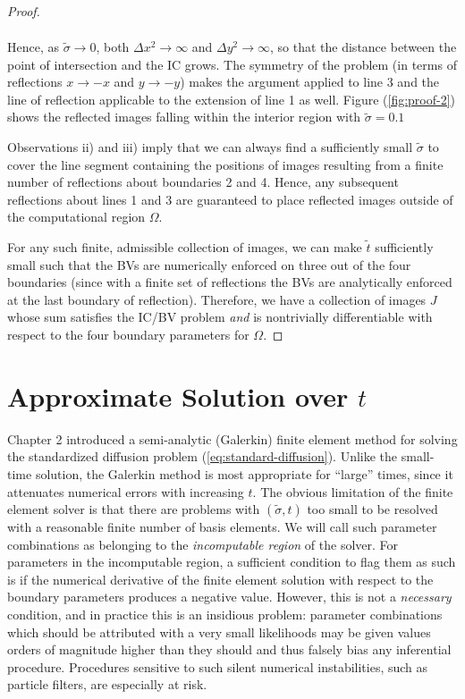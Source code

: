 \documentclass[10pt]{article}
\begin{document}
\begin{proof}
\begin{enumerate}[i)]
\begin{align*}
    \end{align*}
    Hence, as $\tilde{\sigma} \to 0$, both $\Delta x^2 \to \infty$ and
    $\Delta y^2 \to \infty$, so that the distance between the point of
    intersection and the IC grows. The symmetry of the problem (in
    terms of reflections $x \to -x$ and $y \to -y$) makes the argument
    applied to line 3 and the line of reflection applicable to the
    extension of line 1 as well. Figure (\ref{fig:proof-2}) shows the
    reflected images falling within the interior region with
    $\tilde{\sigma} = 0.1$
  \end{enumerate}
  Observations ii) and iii) imply that we can always find a
  sufficiently small $\tilde{\sigma}$ to cover the line segment
  containing the positions of images resulting from a finite number of
  reflections about boundaries 2 and 4.  Hence, any subsequent
  reflections about lines 1 and 3 are guaranteed to place reflected
  images outside of the computational region $\Omega$.

  For any such finite, admissible collection of images, we can make
  $\tilde{t}$ sufficiently small such that the BVs are numerically
  enforced on three out of the four boundaries (since with a finite
  set of reflections the BVs are analytically enforced at the last
  boundary of reflection). Therefore, we have a collection of images
  $J$ whose sum satisfies the IC/BV problem \textit{and} is
  nontrivially differentiable with respect to the four boundary
  parameters for $\Omega$.
\end{proof}

\section{Approximate Solution over $t$}
Chapter 2 introduced a semi-analytic (Galerkin) finite element method
for solving the standardized diffusion problem
(\ref{eq:standard-diffusion}). Unlike the small-time solution, the
Galerkin method is most appropriate for ``large'' times, since it
attenuates numerical errors with increasing $t$. The obvious
limitation of the finite element solver is that there are problems
with $(\tilde{\sigma}, t)$ too small to be resolved with a reasonable
finite number of basis elements. We will call such parameter
combinations as belonging to the \textit{incomputable region} of the
solver. For parameters in the incomputable region, a sufficient
condition to flag them as such is if the numerical derivative of the
finite element solution with respect to the boundary parameters
produces a negative value. However, this is not a \textit{necessary}
condition, and in practice this is an insidious problem: parameter
combinations which should be attributed with a very small likelihoods
may be given values orders of magnitude higher than they should and
thus falsely bias any inferential procedure. Procedures sensitive to
such silent numerical instabilities, such as particle filters, are
especially at risk.
\end{document}
